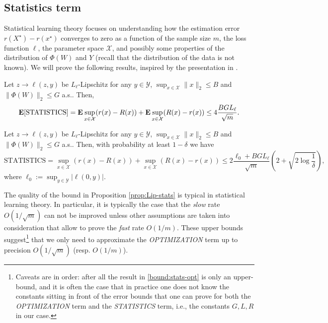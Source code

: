 \subsection{Statistics term}
\label{sec:Statistical learning theory}
Statistical learning theory focuses on understanding how the estimation error $r(X^\star) - r(x^\star)$ converges to zero as a function of the sample size $m$, the loss function $\ell$, the parameter space $\mathcal{X}$, and possibly some properties of the distribution of $\Phi(W)$ and $Y$ (recall that the distribution of the data is not known). We will prove the following results, inspired by the presentation in \cite{bach}.

\begin{proposition}[Mean]
\label{prop:Lip-stats mean}
Let $z\rightarrow \ell(z,y)$ be $L_\ell$-Lipschitz for any $y\in\mathcal{Y}$, $\sup_{x\in\mathcal{X}}\|x\|_2 \le B$ and $\|\Phi(W)\|_2\le G$ a.s.. Then,
$$
	\mathbf{E}[\textrm{STATISTICS}] = \mathbf{E} \sup_{x\in\mathcal{X}} ( r(x) - R(x) ) + \mathbf{E} \sup_{x\in\mathcal{X}} ( R(x) - r(x) )
	\le 4\frac{BGL_\ell}{\sqrt{m}}.
$$
\end{proposition}

\begin{proposition}
\label{prop:Lip-stats}
Let $z\rightarrow \ell(z,y)$ be $L_\ell$-Lipschitz for any $y\in\mathcal{Y}$, $\sup_{x\in\mathcal{X}}\|x\|_2 \le B$ and $\|\Phi(W)\|_2\le G$ a.s.. Then, with probability at least $1-\delta$ we have
$$
	\textrm{STATISTICS} = \sup_{x\in\mathcal{X}} ( r(x) - R(x) ) + \sup_{x\in\mathcal{X}} ( R(x) - r(x) )
	\le 2\frac{\ell_0+BGL_\ell}{\sqrt{m}}\left(2 + \sqrt{2\log \frac{1}{\delta}} \right),
$$
where $\ell_0:=\sup_{y\in\mathcal{Y}} | \ell(0,y) |$.
\end{proposition}

The quality of the bound in Proposition \ref{prop:Lip-stats} is typical in statistical learning theory. In particular, it is typically the case that the \emph{slow} rate $O(1/\sqrt{m})$ can not be improved unless other assumptions are taken into consideration that allow to prove the \emph{fast} rate $O(1/m)$. These upper bounds suggest\footnote{Caveats are in order: after all the result in \eqref{bound:stats-opt} is only an upper-bound, and it is often the case that in practice one does not know the constants sitting in front of the error bounds that one can prove for both the \emph{OPTIMIZATION} term and the \emph{STATISTICS} term, i.e., the constants $G,L,R$ in our case.} that we only need to approximate the \emph{OPTIMIZATION} term up to precision $O(1/\sqrt{m})$ (resp. $O(1/m)$).

